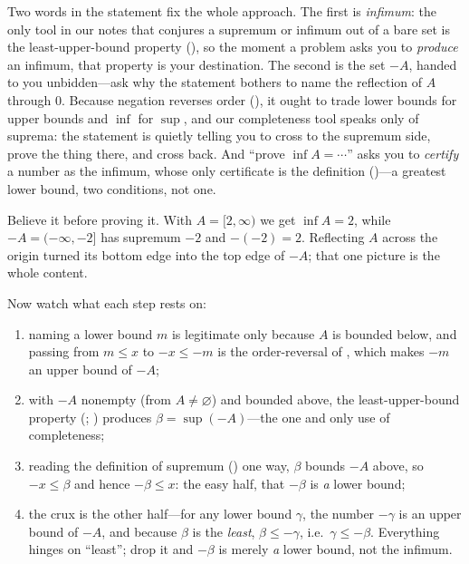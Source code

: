 \documentclass[main.tex]{subfiles}
\begin{document}
\begin{Reflection}
Two words in the statement fix the whole approach. The first is \emph{infimum}: the only tool in our
notes that conjures a supremum or infimum out of a bare set is the least-upper-bound property
(), so the moment a problem asks you to \emph{produce} an infimum, that property is your
destination. The second is the set $-A$, handed to you unbidden---ask why the statement bothers to
name the reflection of $A$ through $0$. Because negation reverses order (), it ought to
trade lower bounds for upper bounds and $\inf$ for $\sup$, and our completeness tool speaks only of
suprema: the statement is quietly telling you to cross to the supremum side, prove the thing there, and
cross back. And ``prove $\inf A=\cdots$'' asks you to \emph{certify} a number as the infimum, whose
only certificate is the definition ()---a greatest lower bound, two conditions, not one.

Believe it before proving it. With $A=[2,\infty)$ we get $\inf A=2$, while $-A=(-\infty,-2]$ has
supremum $-2$ and $-(-2)=2$. Reflecting $A$ across the origin turned its bottom edge into the top edge
of $-A$; that one picture is the whole content.

Now watch what each step rests on:
\begin{enumerate}[leftmargin=1.7em,itemsep=4pt,topsep=2pt,label=\textnormal{(\arabic*)}]
  \item naming a lower bound $m$ is legitimate only because $A$ is bounded below, and passing from
        $m\le x$ to $-x\le -m$ is the order-reversal of , which makes $-m$ an upper bound
        of $-A$;
  \item with $-A$ nonempty (from $A\neq\varnothing$) and bounded above, the least-upper-bound property
        (; ) produces $\beta=\sup(-A)$---the one and only use
        of completeness;
  \item reading the definition of supremum () one way, $\beta$ bounds $-A$ above, so
        $-x\le\beta$ and hence $-\beta\le x$: the easy half, that $-\beta$ is \emph{a} lower bound;
  \item the crux is the other half---for any lower bound $\gamma$, the number $-\gamma$ is an upper
        bound of $-A$, and because $\beta$ is the \emph{least}, $\beta\le-\gamma$, i.e.\
        $\gamma\le-\beta$. Everything hinges on ``least''; drop it and $-\beta$ is merely \emph{a}
        lower bound, not the infimum.
\end{enumerate}


\end{Reflection}
\end{document}
